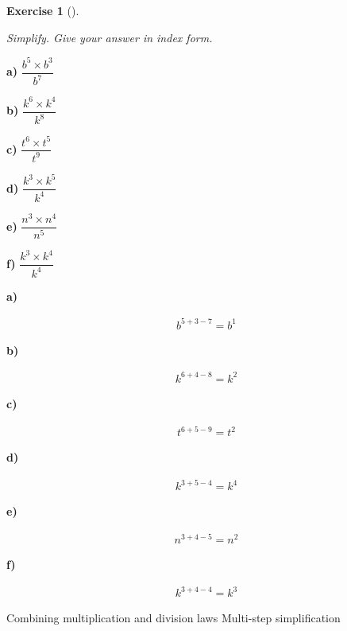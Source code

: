 \documentclass[
  letterpaper,
  DIV=11,
  numbers=noendperiod]{scrreprt}
\theoremstyle{definition}
\newtheorem{exercise}{Exercise}[chapter]
\theoremstyle{remark}
\begin{document}
\begin{exercise}[]\protect\hypertarget{exr-u2-22}{}\label{exr-u2-22}

\emph{Simplify. Give your answer in index form.}

\textbf{a)} \(\displaystyle \dfrac{b^{5} \times b^{3}}{b^{7}}\)

\textbf{b)} \(\displaystyle \dfrac{k^{6} \times k^{4}}{k^{8}}\)

\textbf{c)} \(\displaystyle \dfrac{t^{6} \times t^{5}}{t^{9}}\)

\textbf{d)} \(\displaystyle \dfrac{k^{3} \times k^{5}}{k^{4}}\)

\textbf{e)} \(\displaystyle \dfrac{n^{3} \times n^{4}}{n^{5}}\)

\textbf{f)} \(\displaystyle \dfrac{k^{3} \times k^{4}}{k^{4}}\)

\begin{tcolorbox}[enhanced jigsaw, opacitybacktitle=0.6, coltitle=black, arc=.35mm, colframe=quarto-callout-tip-color-frame, colback=white, bottomrule=.15mm, left=2mm, colbacktitle=quarto-callout-tip-color!10!white, titlerule=0mm, opacityback=0, title=\textcolor{quarto-callout-tip-color}{\faLightbulb}\hspace{0.5em}{🔍 View Solutions}, leftrule=.75mm, breakable, rightrule=.15mm, bottomtitle=1mm, toptitle=1mm, toprule=.15mm]

\textbf{a)}

\[
\begin{aligned}
b^{5+3-7}=b^{1}
\end{aligned}
\]

\textbf{b)}

\[
\begin{aligned}
k^{6+4-8}=k^{2}
\end{aligned}
\]

\textbf{c)}

\[
\begin{aligned}
t^{6+5-9}=t^{2}
\end{aligned}
\]

\textbf{d)}

\[
\begin{aligned}
k^{3+5-4}=k^{4}
\end{aligned}
\]

\textbf{e)}

\[
\begin{aligned}
n^{3+4-5}=n^{2}
\end{aligned}
\]

\textbf{f)}

\[
\begin{aligned}
k^{3+4-4}=k^{3}
\end{aligned}
\]

\end{tcolorbox}

{Combining multiplication and division laws} {Multi-step simplification}

\end{exercise}
\end{document}
